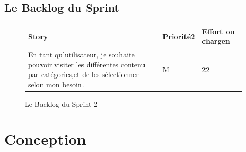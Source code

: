 \subsection{Le Backlog du Sprint}
\begin{figure}[H]
\begin{tabular}{|p{7cm}|p{4cm}|p{4cm}|}
\hline
\textbf{Story} & \textbf{Priorité2 } & \textbf{Effort ou chargen} \\
\hline
En tant qu'utilisateur, je souhaite pouvoir visiter les différentes contenu par catégories,et de les sélectionner selon mon besoin. & \begin{center}M\end{center} & \begin{center}22\end{center}\\
\hline
\end{tabular}
  \caption{Le Backlog du Sprint 2}
  \label{fig:Backlog2}
\end{figure}
\section{Conception}
